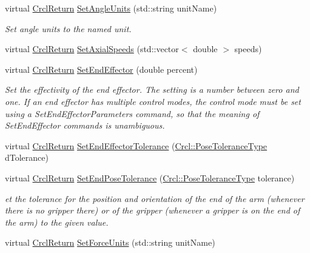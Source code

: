 \begin{DoxyCompactItemize}
\item 
virtual \hyperlink{namespaceCrcl_a1ed3b29723118a020251dde9b12733c0}{Crcl\-Return} \hyperlink{classCrcl_1_1CrclDelegateInterface_a08129b3f3681981b1d0e294a88674269}{Set\-Angle\-Units} (std\-::string unit\-Name)
\begin{DoxyCompactList}\small\item\em Set angle units to the named unit. \end{DoxyCompactList}\item 
virtual \hyperlink{namespaceCrcl_a1ed3b29723118a020251dde9b12733c0}{Crcl\-Return} \hyperlink{classCrcl_1_1CrclDelegateInterface_ae25f975824369ab1b82aa4c1b44c8754}{Set\-Axial\-Speeds} (std\-::vector$<$ double $>$ speeds)
\item 
virtual \hyperlink{namespaceCrcl_a1ed3b29723118a020251dde9b12733c0}{Crcl\-Return} \hyperlink{classCrcl_1_1CrclDelegateInterface_a3e49a7fb746c451704f6c55720f9caec}{Set\-End\-Effector} (double percent)
\begin{DoxyCompactList}\small\item\em Set the effectivity of the end effector. The setting is a number between zero and one. If an end effector has multiple control modes, the control mode must be set using a Set\-End\-Effector\-Parameters command, so that the meaning of Set\-End\-Effector commands is unambiguous. \end{DoxyCompactList}\item 
virtual \hyperlink{namespaceCrcl_a1ed3b29723118a020251dde9b12733c0}{Crcl\-Return} \hyperlink{classCrcl_1_1CrclDelegateInterface_a741f72f042107d75f97e225afb49eed0}{Set\-End\-Effector\-Tolerance} (\hyperlink{namespaceCrcl_ac805071e16341b82d4fa4e12b7f3ac6f}{Crcl\-::\-Pose\-Tolerance\-Type} d\-Tolerance)
\item 
virtual \hyperlink{namespaceCrcl_a1ed3b29723118a020251dde9b12733c0}{Crcl\-Return} \hyperlink{classCrcl_1_1CrclDelegateInterface_a96d2c6e58dbaa65eda19ae857853875b}{Set\-End\-Pose\-Tolerance} (\hyperlink{namespaceCrcl_ac805071e16341b82d4fa4e12b7f3ac6f}{Crcl\-::\-Pose\-Tolerance\-Type} tolerance)
\begin{DoxyCompactList}\small\item\em et the tolerance for the position and orientation of the end of the arm (whenever there is no gripper there) or of the gripper (whenever a gripper is on the end of the arm) to the given value. \end{DoxyCompactList}\item 
virtual \hyperlink{namespaceCrcl_a1ed3b29723118a020251dde9b12733c0}{Crcl\-Return} \hyperlink{classCrcl_1_1CrclDelegateInterface_a6a9e07589fb159c1252f3a1964dab3c5}{Set\-Force\-Units} (std\-::string unit\-Name)

\end{DoxyCompactItemize}
